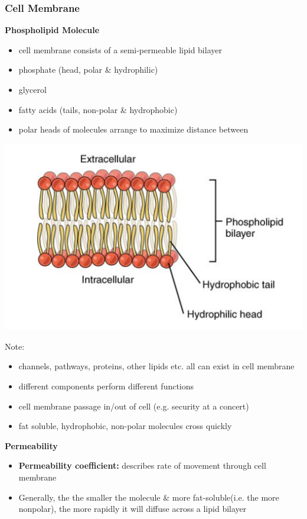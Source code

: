 \documentclass[11pt,fleqn]{book} %
\begin{document}
\subsubsection{Cell Membrane}
\textbf{Phospholipid Molecule}
\begin{itemize}
    \item cell membrane consists of a semi-permeable lipid bilayer
    \item phosphate (head, polar \& hydrophilic)
    \item glycerol
    \item fatty acids (tails, non-polar \& hydrophobic)
    \item polar heads of molecules arrange to maximize distance between
\end{itemize}
\begin{center}
    \includegraphics[width=0.65\linewidth]{Pictures/Screenshot 2024-02-25 205202.png}
\end{center}
Note:
\begin{itemize}
    \item channels, pathways, proteins, other lipids etc. all can exist in cell membrane
    \item different components perform different functions
    \item cell membrane passage in/out of cell (e.g. security at a concert)
    \item fat soluble, hydrophobic, non-polar molecules cross quickly
\end{itemize}
\textbf{Permeability}
\begin{itemize}
    \item \textbf{Permeability coefficient:} describes rate of movement through cell membrane
    \item Generally, the the smaller the molecule \& more fat-soluble(i.e. the more nonpolar), the more rapidly it will diffuse across a lipid bilayer
\end{itemize}
\end{document}
